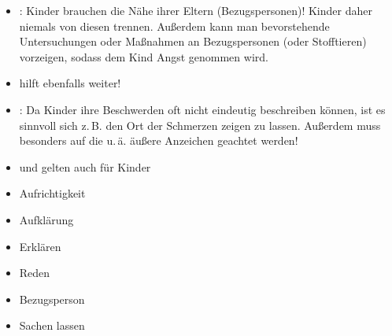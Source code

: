 \documentclass[
ngerman,
paper=a4,
asymmetric,
fontsize=10pt,
draft=false,
numbers=noenddot,
bibtotocnumbered,
footnotes=multiple,
]{scrreprt}
\begin{document}
{\begin{itemize}
  \item {}: Kinder brauchen die Nähe ihrer Eltern
  (Bezugspersonen)! Kinder daher niemals von diesen trennen. Außerdem kann man
  bevorstehende Untersuchungen oder Maßnahmen an Bezugspersonen (oder
  Stofftieren) vorzeigen, sodass dem Kind Angst genommen wird.
  \item {} hilft ebenfalls weiter!
  \item {}: Da Kinder ihre Beschwerden oft nicht
  eindeutig beschreiben können, ist es sinnvoll sich z.\,B. den
  Ort der Schmerzen zeigen zu lassen. Außerdem muss besonders auf die
   u.\,ä.
  äußere Anzeichen geachtet werden!
\end{itemize}
}{
\begin{itemize}
  \item {} und  gelten auch
  für Kinder
  \item Aufrichtigkeit
  \item Aufklärung
  \item Erklären
  \item Reden
  \item Bezugsperson
  \item Sachen  lassen
\end{itemize}
}{}{}{}
\end{document}
